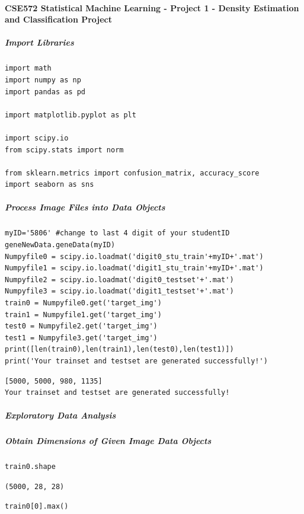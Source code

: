 \paragraph{CSE572 Statistical Machine Learning - Project 1 - Density Estimation and Classification Project}

\subparagraph{Import Libraries}

\begin{verbatim}
import math
import numpy as np
import pandas as pd

import matplotlib.pyplot as plt

import scipy.io
from scipy.stats import norm

from sklearn.metrics import confusion_matrix, accuracy_score
import seaborn as sns
\end{verbatim}

\subparagraph{Process Image Files into Data Objects}

\begin{verbatim}
myID='5806' #change to last 4 digit of your studentID
geneNewData.geneData(myID)
Numpyfile0 = scipy.io.loadmat('digit0_stu_train'+myID+'.mat')
Numpyfile1 = scipy.io.loadmat('digit1_stu_train'+myID+'.mat')
Numpyfile2 = scipy.io.loadmat('digit0_testset'+'.mat')
Numpyfile3 = scipy.io.loadmat('digit1_testset'+'.mat')
train0 = Numpyfile0.get('target_img')
train1 = Numpyfile1.get('target_img')
test0 = Numpyfile2.get('target_img')
test1 = Numpyfile3.get('target_img')
print([len(train0),len(train1),len(test0),len(test1)])
print('Your trainset and testset are generated successfully!')
\end{verbatim}

\begin{verbatim}
[5000, 5000, 980, 1135]
Your trainset and testset are generated successfully!
\end{verbatim}

\subparagraph{Exploratory Data Analysis}

\subparagraph{Obtain Dimensions of Given Image Data Objects}

\begin{verbatim}
train0.shape
\end{verbatim}

\begin{verbatim}
(5000, 28, 28)
\end{verbatim}

\begin{verbatim}
train0[0].max()
\end{verbatim}

